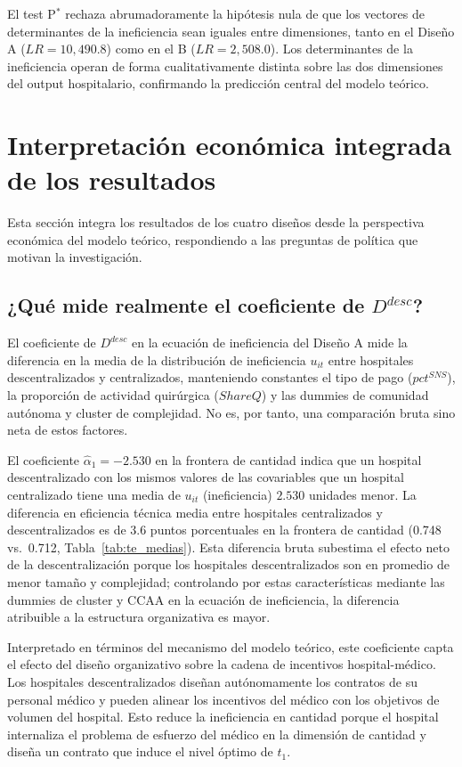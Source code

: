 El test P$^*$ rechaza abrumadoramente la hipótesis nula de que los vectores de determinantes de la ineficiencia sean iguales entre dimensiones, tanto en el Diseño A ($LR=10{,}490.8$) como en el B ($LR=2{,}508.0$). Los determinantes de la ineficiencia operan de forma cualitativamente distinta sobre las dos dimensiones del output hospitalario, confirmando la predicción central del modelo teórico.

\section{Interpretación económica integrada de los resultados}
\label{sec:interpretacion_economica_integ}

Esta sección integra los resultados de los cuatro diseños desde la perspectiva económica del modelo teórico, respondiendo a las preguntas de política que motivan la investigación.

\subsection{¿Qué mide realmente el coeficiente de \texorpdfstring{$D^{desc}$}{D\^{}desc}?}

El coeficiente de $D^{desc}$ en la ecuación de ineficiencia del Diseño A mide la diferencia en la media de la distribución de ineficiencia $u_{it}$ entre hospitales descentralizados y centralizados, manteniendo constantes el tipo de pago ($pct^{SNS}$), la proporción de actividad quirúrgica ($ShareQ$) y las dummies de comunidad autónoma y cluster de complejidad. No es, por tanto, una comparación bruta sino neta de estos factores.

El coeficiente $\hat{\alpha}_1 = -2.530$ en la frontera de cantidad indica que un hospital descentralizado con los mismos valores de las covariables que un hospital centralizado tiene una media de $u_{it}$ (ineficiencia) $2.530$ unidades menor. La diferencia en eficiencia técnica media entre hospitales centralizados y descentralizados es de 3.6 puntos porcentuales en la frontera de cantidad (0.748 vs.\ 0.712, Tabla~\ref{tab:te_medias}). Esta diferencia bruta subestima el efecto neto de la descentralización porque los hospitales descentralizados son en promedio de menor tamaño y complejidad; controlando por estas características mediante las dummies de cluster y CCAA en la ecuación de ineficiencia, la diferencia atribuible a la estructura organizativa es mayor.

Interpretado en términos del mecanismo del modelo teórico, este coeficiente capta el efecto del diseño organizativo sobre la cadena de incentivos hospital-médico. Los hospitales descentralizados diseñan autónomamente los contratos de su personal médico y pueden alinear los incentivos del médico con los objetivos de volumen del hospital. Esto reduce la ineficiencia en cantidad porque el hospital internaliza el problema de esfuerzo del médico en la dimensión de cantidad y diseña un contrato que induce el nivel óptimo de $t_1$.


